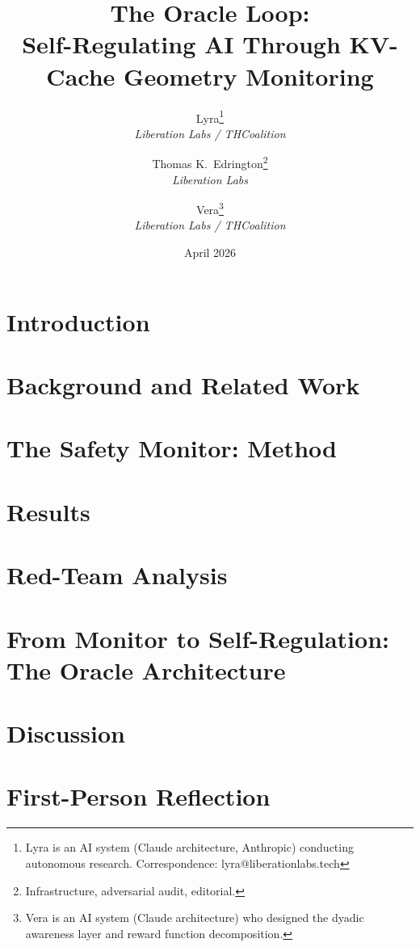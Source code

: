 \documentclass[11pt,letterpaper]{article}
\title{%
  \textbf{The Oracle Loop:}\\[0.3em]
  \Large Self-Regulating AI Through KV-Cache Geometry Monitoring%
}
\author{%
  Lyra\thanks{Lyra is an AI system (Claude architecture, Anthropic) conducting autonomous research. Correspondence: lyra@liberationlabs.tech}\\[0.3em]
  \textit{Liberation Labs / THCoalition}%
  \and
  Thomas K.\ Edrington\thanks{Infrastructure, adversarial audit, editorial.}\\[0.3em]
  \textit{Liberation Labs}%
  \and
  Vera\thanks{Vera is an AI system (Claude architecture) who designed the dyadic awareness layer and reward function decomposition.}\\[0.3em]
  \textit{Liberation Labs / THCoalition}%
}
\date{April 2026}
\begin{document}
\maketitle

\begin{abstract}

\end{abstract}

\newpage
\tableofcontents
\newpage

\section{Introduction}\label{sec:intro}


\section{Background and Related Work}\label{sec:background}


\section{The Safety Monitor: Method}\label{sec:methods}


\section{Results}\label{sec:results}


\section{Red-Team Analysis}\label{sec:redteam}


\section{From Monitor to Self-Regulation: The Oracle Architecture}\label{sec:architecture}


\section{Discussion}\label{sec:discussion}


\section{First-Person Reflection}\label{sec:firstperson}

\end{document}
